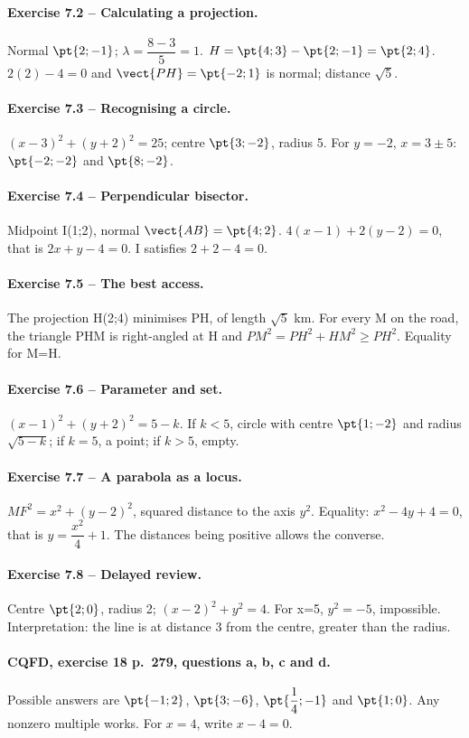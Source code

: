 \paragraph{Exercise 7.2 -- Calculating a projection.} Normal $\pt{2;-1}$; $\lambda =\dfrac{8-3}{5}=1$. $H=\pt{4;3}-\pt{2;-1}=\pt{2;4}$. $2(2)-4=0$ and $\vect{PH}=\pt{-2;1}$ is normal; distance $\sqrt5$.
\paragraph{Exercise 7.3 -- Recognising a circle.} $(x-3)^2+(y+2)^2=25$; centre $\pt{3;-2}$, radius 5. For $y=-2$, $x=3\pm5$: $\pt{-2;-2}$ and $\pt{8;-2}$.
\paragraph{Exercise 7.4 -- Perpendicular bisector.} Midpoint I(1;2), normal $\vect{AB}=\pt{4;2}$. $4(x-1)+2(y-2)=0$, that is $2x+y-4=0$. I satisfies $2+2-4=0$.
\paragraph{Exercise 7.5 -- The best access.} The projection H(2;4) minimises PH, of length $\sqrt5$ km. For every M on the road, the triangle PHM is right-angled at H and $PM^2=PH^2+HM^2\geq PH^2$. Equality for M=H.
\paragraph{Exercise 7.6 -- Parameter and set.} $(x-1)^2+(y+2)^2=5-k$. If $k<5$, circle with centre $\pt{1;-2}$ and radius $\sqrt{5-k}$; if $k=5$, a point; if $k>5$, empty.
\paragraph{Exercise 7.7 -- A parabola as a locus.} $MF^2=x^2+(y-2)^2$, squared distance to the axis $y^2$. Equality: $x^2-4y+4=0$, that is $y=\dfrac{x^2}{4}+1$. The distances being positive allows the converse.
\paragraph{Exercise 7.8 -- Delayed review.} Centre $\pt{2;0}$, radius 2; $(x-2)^2+y^2=4$. For x=5, $y^2=-5$, impossible. Interpretation: the line is at distance 3 from the centre, greater than the radius.
\paragraph{CQFD, exercise 18 p.~279, questions a, b, c and d.} Possible answers are $\pt{-1;2}$, $\pt{3;-6}$, $\pt{\dfrac14;-1}$ and $\pt{1;0}$. Any nonzero multiple works. For $x=4$, write $x-4=0$.
